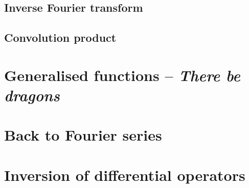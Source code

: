 \subsection{Inverse Fourier transform}
\subsection{Convolution product}
\section{Generalised functions -- \textit{There be dragons}}
\section{Back to Fourier series}
\section{Inversion of differential operators}